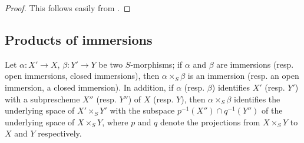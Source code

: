 \begin{proof}
\label{proof-1.4.2.5}
This follows easily from .
\end{proof}

\subsection{Products of immersions}
\label{subsection-products-of-immersions}

\begin{prop}[4.3.1]
\label{1.4.3.1}
Let $\alpha:X'\to X$, $\beta:Y'\to Y$ be two $S$-morphisms;
if $\alpha$ and $\beta$ are immersions (resp. open immersions, closed immersions), then $\alpha\times_S\beta$ is an immersion (resp. an open immersion, a closed immersion).
In addition, if $\alpha$ (resp. $\beta$) identifies $X'$ (resp. $Y'$) with a subprescheme $X''$ (resp. $Y''$) of $X$ (resp. $Y$), then $\alpha\times_S\beta$ identifies the underlying space of $X'\times_S Y'$ with the subspace $p^{-1}(X'')\cap q^{-1}(Y'')$ of the underlying space of $X\times_S Y$, where $p$ and $q$ denote the projections from $X\times_S Y$ to $X$ and $Y$ respectively.
\end{prop}


